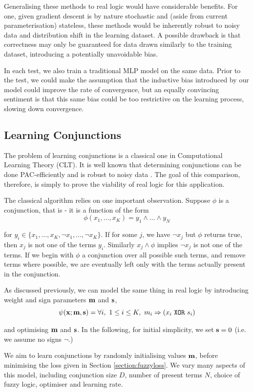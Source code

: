 Generalising these methods to real logic would have considerable benefits. For one, given gradient descent is by nature stochastic and (aside from current parameterisation) stateless, these methods would be inherently robust to noisy data and distribution shift in the learning dataset. A possible drawback is that correctness may only be guaranteed for data drawn similarly to the training dataset, introducing a potentially unavoidable bias.

In each test, we also train a traditional MLP model on the same data. Prior to the test, we could make the assumption that the inductive bias introduced by our model could improve the rate of convergence, but an equally convincing sentiment is that this same bias could be too restrictive on the learning process, slowing down convergence.

\subsection{Learning Conjunctions}

The problem of learning conjunctions is a classical one in Computational Learning Theory (CLT). It is well known that determining conjunctions can be done PAC-efficiently \cite{clt} and is robust to noisy data \cite{noisyclt}. The goal of this comparison, therefore, is simply to prove the viability of real logic for this application.

The classical algorithm relies on one important observation. Suppose $\phi$ is a conjunction, that is - it is a function of the form 
$$\phi(x_1, \dots, x_K) = y_1 \land \dots \land y_N$$

for $y_i \in \{x_1, \dots, x_K, \lnot x_1, \dots, \lnot x_K\}$. If for some $j$, we have $\lnot x_j$ but $\phi$ returns true, then $x_j$ is not one of the terms $y_i$. Similarly $x_j \land \phi$ implies $\lnot x_j$ is not one of the terms. If we begin with $\phi$ a conjunction over all possible such terms, and remove terms where possible, we are eventually left only with the terms actually present in the conjunction.

As discussed previously, we can model the same thing in real logic by introducing weight and sign parameters $\mathbf{m}$ and $\mathbf{s}$, 
$$\psi(\mathbf{x}; \mathbf{m}, \mathbf{s}) = \forall i,\ 1 \leq i \leq K,\ m_i \Rightarrow (x_i \ \texttt{XOR}\  s_i)$$

and optimising $\mathbf{m}$ and $\mathbf{s}$. In the following, for initial simplicity, we set $\mathbf{s} = 0$ (i.e. we assume no signs $\lnot$.) 

We aim to learn conjunctions by randomly initialising values $\mathbf{m}$, before minimising the loss given in Section \ref{section:fuzzyloss}. We vary many aspects of this model, including conjunction size $D$, number of present terms $N$, choice of fuzzy logic, optimiser and learning rate.


